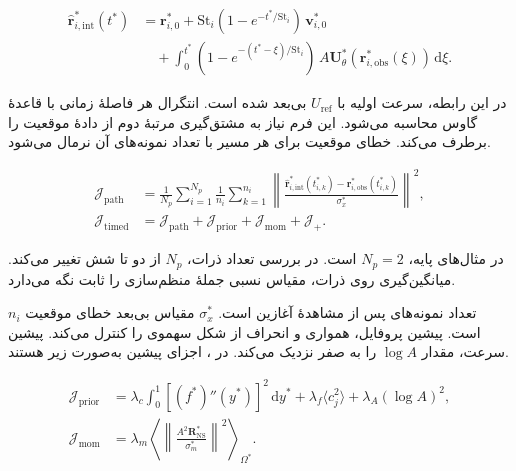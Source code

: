 \begin{equation}
\begin{aligned}
\widehat{\mathbf r}_{i,\mathrm{int}}^*(t^*)
&=\mathbf r_{i,0}^*
 +\mathrm{St}_i(1-e^{-t^*/\mathrm{St}_i})\,\mathbf v_{i,0}^*\\
&\quad+\int_0^{t^*}
  (1-e^{-(t^*-\xi)/\mathrm{St}_i})\,
  A\mathbf U_\theta^*(\mathbf r_{i,\mathrm{obs}}^*(\xi))\,\mathrm d\xi .
\end{aligned}
\label{eq:inverse-flow-integral-path}
\end{equation}

در این رابطه، سرعت اولیه با $U_{\mathrm{ref}}$ بی‌بعد شده است.
انتگرال هر فاصلهٔ زمانی با قاعدهٔ گاوس محاسبه می‌شود.
این فرم نیاز به مشتق‌گیری مرتبهٔ دوم از دادهٔ موقعیت را برطرف می‌کند.
خطای موقعیت برای هر مسیر با تعداد نمونه‌های آن نرمال می‌شود.

\begin{equation}
\begin{aligned}
\mathcal J_{\mathrm{path}}
&=\frac{1}{N_p}\sum_{i=1}^{N_p}\frac{1}{n_i}
\sum_{k=1}^{n_i}
\left\|
\frac{\widehat{\mathbf r}_{i,\mathrm{int}}^*(t_{i,k}^*)
-\mathbf r_{i,\mathrm{obs}}^*(t_{i,k}^*)}{\sigma_x^*}
\right\|^2,\\
\mathcal J_{\mathrm{timed}}
&=\mathcal J_{\mathrm{path}}
+\mathcal J_{\mathrm{prior}}+\mathcal J_{\mathrm{mom}}+\mathcal J_+.
\end{aligned}
\label{eq:inverse-flow-timed-objective}
\end{equation}

در مثال‌های پایه، $N_p=2$ است.
در بررسی تعداد ذرات، $N_p$ از دو تا شش تغییر می‌کند.
میانگین‌گیری روی ذرات، مقیاس نسبی جملهٔ منظم‌سازی را ثابت نگه می‌دارد.

$n_i$ تعداد نمونه‌های پس از مشاهدهٔ آغازین است.
$\sigma_x^*$ مقیاس بی‌بعد خطای موقعیت است.
پیشین پروفایل، همواری و انحراف از شکل سهموی را کنترل می‌کند.
پیشین سرعت، مقدار $\log A$ را به صفر نزدیک می‌کند.
در ، اجزای پیشین به‌صورت زیر هستند.

\begin{equation}
\begin{aligned}
\mathcal J_{\mathrm{prior}} &=
\lambda_c\int_0^1[(f^*)''(y^*)]^2\,\mathrm dy^*
 +\lambda_f\langle c_j^2\rangle+\lambda_A(\log A)^2,\\
\mathcal J_{\mathrm{mom}} &=
\lambda_m\left\langle
\left\|\frac{A^2\mathbf R_{\mathrm{NS}}^*}{\sigma_m^*}\right\|^2
\right\rangle_{\Omega^*}.
\end{aligned}
\label{eq:inverse-flow-prior-physics}
\end{equation}

